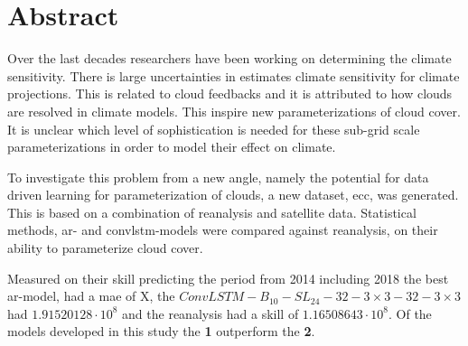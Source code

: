 \chapter*{Abstract}

Over the last decades researchers have been working on determining the climate sensitivity. 
There is large uncertainties in estimates climate sensitivity for climate projections. This is related to cloud feedbacks and it is attributed to how clouds are resolved in climate models. 
This inspire new parameterizations of cloud cover. It is unclear which level of sophistication is needed for these sub-grid scale parameterizations in order to model their effect on climate.

To investigate this problem from a new angle, namely the potential for data driven learning for parameterization of clouds, a new dataset, \acrfull{ecc}, was generated. This is based on a combination of reanalysis and satellite data. %
Statistical methods, \acrfull{ar}- and \acrfull{convlstm}-models were compared against reanalysis, on their ability to parameterize cloud cover. 

Measured on their skill predicting the period
from 2014 including 2018 the best \acrshort{ar}-model, had a \acrshort{mae} of X,  the $ConvLSTM-B_{10}-SL_{24}-32-3\times3-32-3 \times3$ had $1.91520128 \cdot 10^8$ and the reanalysis had a skill of $1.16508643\cdot10^8$. Of the models developed in this study the \textbf{1} outperform the \textbf{2}.

